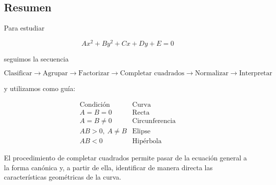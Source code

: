 \documentclass[12pt]{article}
\begin{document}
\subsection*{Resumen}

Para estudiar

\[
\boxed{
Ax^2+By^2+Cx+Dy+E=0
}
\]

seguimos la secuencia

\[
\boxed{
\text{Clasificar}
\longrightarrow
\text{Agrupar}
\longrightarrow
\text{Factorizar}
\longrightarrow
\text{Completar cuadrados}
\longrightarrow
\text{Normalizar}
\longrightarrow
\text{Interpretar}
}
\]

y utilizamos como guía:

\[
\boxed{
\begin{array}{c|c}
\text{Condición} & \text{Curva}\\
\hline
A=B=0 & \text{Recta}\\
A=B\neq0 & \text{Circunferencia}\\
AB>0,\ A\neq B & \text{Elipse}\\
AB<0 & \text{Hipérbola}
\end{array}
}
\]

El procedimiento de completar cuadrados permite pasar de la ecuación
general a la forma canónica y, a partir de ella, identificar de manera
directa las características geométricas de la curva.
\end{document}
